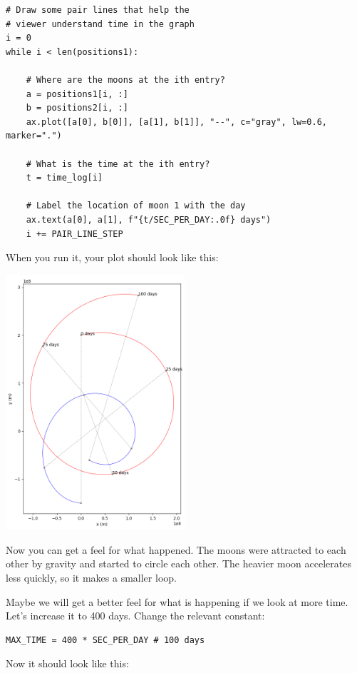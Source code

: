 \begin{verbatim}
# Draw some pair lines that help the
# viewer understand time in the graph
i = 0
while i < len(positions1):

    # Where are the moons at the ith entry?
    a = positions1[i, :]
    b = positions2[i, :]
    ax.plot([a[0], b[0]], [a[1], b[1]], "--", c="gray", lw=0.6, marker=".")

    # What is the time at the ith entry?
    t = time_log[i]

    # Label the location of moon 1 with the day
    ax.text(a[0], a[1], f"{t/SEC_PER_DAY:.0f} days")
    i += PAIR_LINE_STEP
\end{verbatim}

When you run it,  your plot should look like this:

\includegraphics[width=0.5\textwidth]{plotmoons_02.png}

Now you can get a feel for what happened.  The moons were attracted to each other by gravity and started to circle each other. The heavier moon accelerates less quickly,  so it makes a smaller loop.

Maybe we will get a better feel for what is happening if we look at more time. Let's increase it to 400 days. Change the relevant constant:

\begin{verbatim}
MAX_TIME = 400 * SEC_PER_DAY # 100 days
\end{verbatim}

Now it should look like this:

